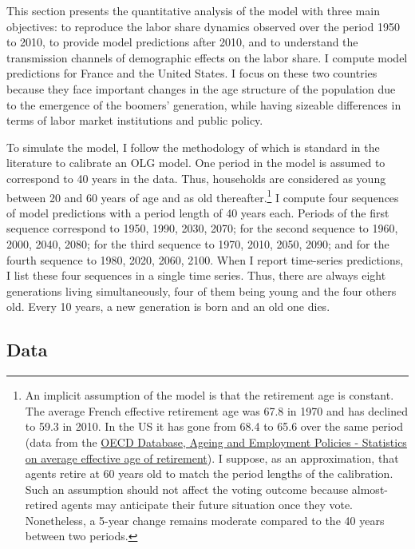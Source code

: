 This section presents the quantitative analysis of the model with three main objectives: to reproduce the labor share dynamics observed over the period 1950 to 2010, to provide model predictions after 2010, and to understand the transmission channels of demographic effects on the labor share. I compute model predictions for France and the United States. I focus on these two countries because they face important changes in the age structure of the population due to the emergence of the boomers' generation, while having sizeable differences in terms of labor market institutions and public policy.

To simulate the model, I follow the methodology of \citet{Gonzalez-Eiras2012Ageing} which is standard in the literature to calibrate an OLG model. One period in the model is assumed to correspond to 40 years in the data. Thus, households are considered as young between 20 and 60 years of age and as old thereafter.\footnote{An implicit assumption of the model is that the retirement age is constant. The average French effective retirement age was 67.8 in 1970 and has declined to 59.3 in 2010. In the US it has gone from 68.4 to 65.6 over the same period (data from the \href{https://www.oecd.org/els/emp/average-effective-age-of-retirement.htm}{OECD Database, Ageing and Employment Policies - Statistics on average effective age of retirement}). I suppose, as an approximation, that agents retire at 60 years old to match the period lengths of the calibration. Such an assumption should not affect the voting outcome because almost-retired agents may anticipate their future situation once they vote. Nonetheless, a 5-year change remains moderate compared to the 40 years between two periods.}
I compute four sequences of model predictions with a period length of 40 years each. Periods of the first sequence correspond to 1950, 1990, 2030, 2070; for the second sequence to 1960, 2000, 2040, 2080; for the third sequence to 1970, 2010, 2050, 2090; and for the fourth sequence to 1980, 2020, 2060, 2100. When I report time-series predictions, I list these four sequences in a single time series. Thus, there are always eight generations living simultaneously, four of them being young and the four others old. Every 10 years, a new generation is born and an old one dies.

\subsection{Data}\label{chap1-data}

